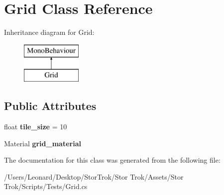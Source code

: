\hypertarget{class_grid}{}\section{Grid Class Reference}
\label{class_grid}
Inheritance diagram for Grid\+:\begin{figure}[H]
\begin{center}
\leavevmode
\includegraphics[height=2.000000cm]{class_grid}
\end{center}
\end{figure}
\subsection*{Public Attributes}
\begin{DoxyCompactItemize}
\item 
\mbox{\label{class_grid_adae5c3aff7bef22c94ead5886b01f7c1}} 
float {\bfseries tile\+\_\+size} = 10
\item 
\mbox{\label{class_grid_a9fdf4a2c1386a1fc9ece1ae594054ed6}} 
Material {\bfseries grid\+\_\+material}
\end{DoxyCompactItemize}


The documentation for this class was generated from the following file\+:\begin{DoxyCompactItemize}
\item 
/\+Users/\+Leonard/\+Desktop/\+Stor\+Trok/\+Stor Trok/\+Assets/\+Stor Trok/\+Scripts/\+Tests/Grid.\+cs\end{DoxyCompactItemize}
